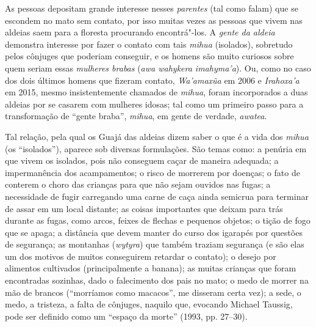 As pessoas depositam grande interesse nesses \emph{parentes} (tal como
falam) que se escondem no mato sem contato, por isso muitas vezes as
pessoas que vivem nas aldeias saem para a floresta procurando
encontrá"-los. A \emph{gente da aldeia} demonstra interesse por fazer o
contato com tais \emph{mihua} (isolados), sobretudo pelos cônjuges que
poderiam conseguir, e os homens são muito curiosos sobre quem seriam
essas \emph{mulheres brabas} (\emph{awa wahykera imahyma'a}). Ou, como
no caso dos dois últimos homens que fizeram contato, \emph{Wa'amaxũa} em
2006 e \emph{Irahoxa'a} em 2015, mesmo insistentemente chamados de
\emph{mihua}, foram incorporados a duas aldeias por se casarem com
mulheres idosas; tal como um primeiro passo para a transformação de
``gente braba'', \emph{mihua}, em gente de verdade, \emph{awatea}.

Tal relação, pela qual os Guajá das aldeias dizem saber o que é a vida
dos \emph{mihua} (os ``isolados''), aparece sob diversas formulações. São
temas como: a penúria em que vivem os isolados, pois não conseguem caçar
de maneira adequada; a impermanência dos acampamentos; o risco de
morrerem por doenças; o fato de conterem o choro das crianças para que
não sejam ouvidos nas fugas; a necessidade de fugir carregando uma carne
de caça ainda semicrua para terminar de assar em um local distante; as
coisas importantes que deixam para trás durante as fugas, como arcos,
feixes de flechas e pequenos objetos; o tição de fogo que se apaga; a
distância que devem manter do curso dos igarapés por questões de
segurança; as montanhas (\emph{wytyra}) que também traziam segurança (e
são elas um dos motivos de muitos conseguirem retardar o contato); o
desejo por alimentos cultivados (principalmente a banana); as muitas
crianças que foram encontradas sozinhas, dado o falecimento dos pais no
mato; o medo de morrer na mão de brancos (``morríamos como macacos'', me
disseram certa vez); a sede, o medo, a tristeza, a falta de cônjuges,
naquilo que, evocando Michael Taussig, pode ser definido como um ``espaço
da morte'' (1993, pp. 27--30).

